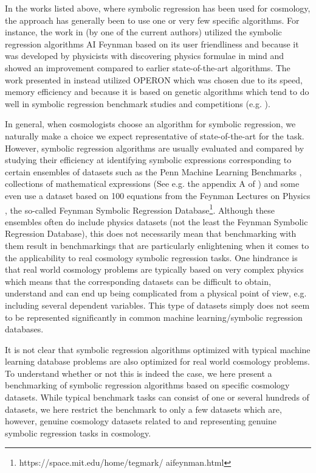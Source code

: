 \documentclass[a4paper,11pt]{article}
\begin{document}
	In the works listed above, where symbolic regression has been used for cosmology, the approach has generally been to use one or very few specific algorithms. For instance, the work in \cite{zdrift1, zdrift2} (by one of the current authors) utilized the symbolic regression algorithms AI Feynman \cite{Feynman1, Feynman2} based on its user friendliness and because it was developed by physicists with discovering physics formulae in mind and showed an improvement compared to earlier state-of-the-art algorithms. The work presented in \cite{ps} instead utilized OPERON \cite{operon} which was chosen due to its speed, memory efficiency and because it is based on genetic algorithms which tend to do well in symbolic regression benchmark studies and competitions (e.g. \cite{benchmark, competition}). 

	In general, when cosmologists choose an algorithm for symbolic regression, we naturally make a choice we expect representative of state-of-the-art for the task.  However, symbolic regression algorithms are usually evaluated and compared by studying their efficiency at identifying symbolic expressions corresponding to certain ensembles of datasets such as the Penn Machine Learning Benchmarks \cite{PMLB1, PMLB2}, collections of mathematical expressions (See e.g. the appendix A of \cite{review}) and some even use a dataset based on 100 equations from the Feynman Lectures on Physics \cite{FeynmanLectures}, the so-called Feynman Symbolic Regression Database\footnote{https://space.mit.edu/home/tegmark/
	aifeynman.html}. Although these ensembles often do include physics datasets (not the least the Feynman Symbolic Regression Database), this does not necessarily mean that benchmarking with them result in benchmarkings that are particularly enlightening when it comes to the applicability to real cosmology symbolic regression tasks. One hindrance is that real world cosmology problems are typically based on very complex physics which means that the corresponding datasets can be difficult to obtain, understand and can end up being complicated from a physical point of view, e.g. including several dependent variables. This type of datasets simply does not seem to be represented significantly in common machine learning/symbolic regression databases.

It is not clear that symbolic regression algorithms optimized with typical machine learning database problems are also optimized for real world cosmology problems. To understand whether or not this is indeed the case, we here present a benchmarking of symbolic regression algorithms based on specific cosmology datasets. While typical benchmark tasks can consist of one or several hundreds of datasets, we here restrict the benchmark to only a few datasets which are, however, genuine cosmology datasets related to and representing genuine symbolic regression tasks in cosmology.
\end{document}
